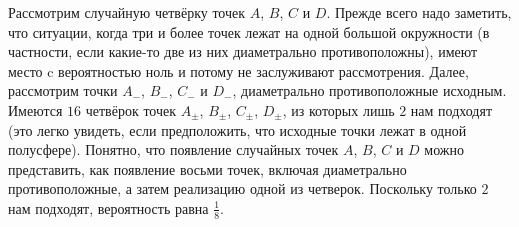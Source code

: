 \documentclass{article}
\begin{document}
Рассмотрим случайную четвёрку точек $A$, $B$, $C$ и $D$. Прежде всего надо заметить, что
ситуации, когда три и более точек лежат на одной большой окружности (в частности, если
какие-то две из них диаметрально противоположны), имеют место c вероятностью ноль и
потому не заслуживают рассмотрения. Далее, рассмотрим точки $A_-$, $B_-$, $C_-$ и $D_-$,
диаметрально противоположные исходным. Имеются $16$ четвёрок точек $A_\pm$, $B_\pm$, $C_\pm$, $D_\pm$, из
которых лишь $2$ нам подходят (это легко увидеть, если предположить, что исходные
точки лежат в одной полусфере). Понятно, что появление случайных точек $A$, $B$, $C$ и $D$ можно представить, 
как появление восьми точек, включая диаметрально противоположные, а затем реализацию одной из четверок. Поскольку только $2$ 
нам подходят, вероятность равна $\frac18$. 
\end{document}
